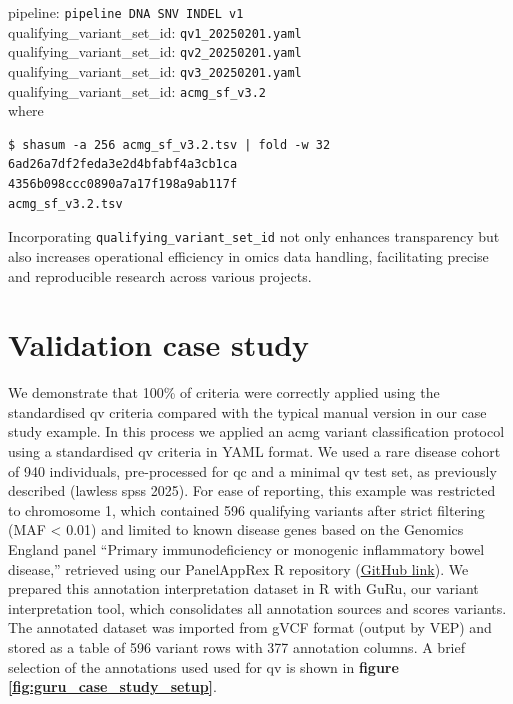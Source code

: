 \begin{tcolorbox}[
    colback=white!0,  %
    colframe=black,  %
    boxrule=1pt,  %
    arc=1mm,  %
    outer arc=1mm,
   title=\textbf{\refstepcounter{myboxcounter}\label{box:example_concept}Box \themyboxcounter: Example implementation}
]

pipeline: \colorbox{colorSUNSET1!30}{\texttt{pipeline DNA SNV INDEL v1}}\\
qualifying\_variant\_set\_id: \colorbox{colorSUNSET2!60}{\texttt{qv1\_20250201.yaml}}\\
qualifying\_variant\_set\_id: \colorbox{colorSUNSET2!60}{\texttt{qv2\_20250201.yaml}}\\
qualifying\_variant\_set\_id: \colorbox{colorSUNSET2!60}{\texttt{qv3\_20250201.yaml}}\\
qualifying\_variant\_set\_id: \colorbox{colorSUNSET2!60}{\texttt{acmg\_sf\_v3.2}}\\

where 
\begin{verbatim}
$ shasum -a 256 acmg_sf_v3.2.tsv | fold -w 32
6ad26a7df2feda3e2d4bfabf4a3cb1ca
4356b098ccc0890a7a17f198a9ab117f
acmg_sf_v3.2.tsv
\end{verbatim}
\end{tcolorbox}

Incorporating \texttt{qualifying\_variant\_set\_id} not only enhances transparency but also increases operational efficiency in omics data handling, facilitating precise and reproducible research across various projects.

\section{Validation case study}

We demonstrate that 100\% of criteria were correctly applied using the standardised \ac{qv} criteria compared with the typical manual version in our case study example.
In this process we applied an \ac{acmg} variant classification
protocol \cite{richards2015standards} using a standardised \ac{qv} criteria in YAML format.
We used a rare disease cohort of 940 individuals, pre-processed for 
\ac{qc} and a minimal \ac{qv} test set, as previously described (lawless spss 2025). 
For ease of reporting, this example was restricted to chromosome 1, which contained 596 qualifying variants after strict filtering (MAF < 0.01) and limited to known disease genes based on the Genomics England panel ``Primary immunodeficiency or monogenic inflammatory bowel disease,'' retrieved using our PanelAppRex R repository (\href{https://github.com/DylanLawless/PanelAppRex}{GitHub link}). 
We prepared this annotation interpretation dataset in R with GuRu, our variant interpretation tool, which consolidates all annotation sources and scores variants. The annotated dataset was imported from gVCF format (output by VEP) and stored as a table of 596 variant rows with 377 annotation columns. A brief selection of the annotations used used for \ac{qv} is shown in \textbf{figure \ref{fig:guru_case_study_setup}}.

